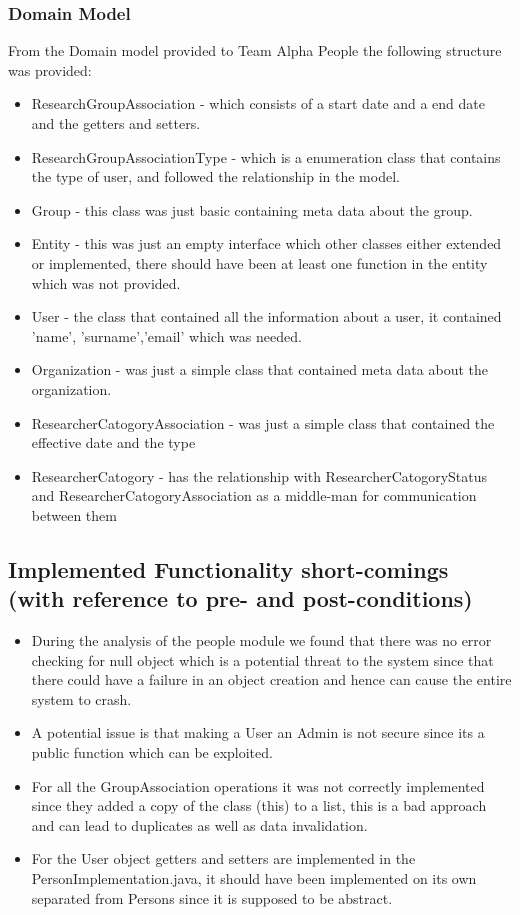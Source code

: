 \documentclass{article}
\begin{document}
	\subsubsection{Domain Model}
	From the Domain model provided to Team Alpha People the following structure was provided:
	\begin{itemize}
	 \item ResearchGroupAssociation - which consists of a start date and a end date and the getters and setters.
	 \item ResearchGroupAssociationType - which is a enumeration class that contains the type of user, and followed the relationship in the model.
	 \item Group - this class was just basic containing meta data about the group.
	 \item Entity - this was just an empty interface which other classes either extended or implemented, there should have been at least one function in the entity which was not provided.
	 \item User - the class that contained all the information about a user, it contained 'name', 'surname','email' which was needed.
	 \item Organization - was just a simple class that contained meta data about the organization.
	 \item ResearcherCatogoryAssociation - was just a simple class that contained the effective date and the type
	 \item ResearcherCatogory - has the relationship with ResearcherCatogoryStatus and ResearcherCatogoryAssociation as a middle-man for communication between them
	 
	 
	 

	\end{itemize}

	

    \subsection{Implemented Functionality short-comings (with reference to pre- and post-conditions)}
	\begin{itemize}
	
	    \item During the analysis of the people module we found that there was no error checking for null object which is a potential threat to the system since that there could have a failure in an object creation and hence can cause the entire system to crash.
	    \item A potential issue is that making a User an Admin is not secure since its a public function which can be exploited.
	    \item For all the GroupAssociation operations it was not correctly implemented since they added a copy of the class (this) to a list, this is a bad approach and can lead to duplicates as well as data invalidation.
	    \item For the User object getters and setters are implemented in the PersonImplementation.java, it should have been implemented on its own separated from Persons since it is supposed to be abstract. 

	\end{itemize}
\end{document}
